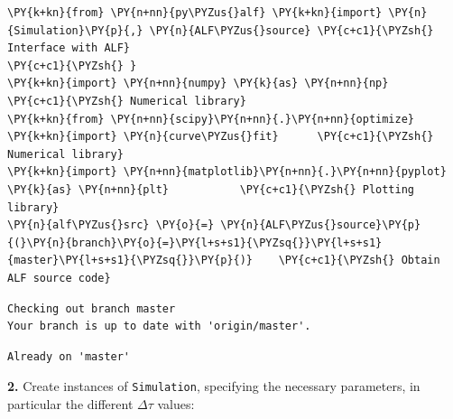     \begin{tcolorbox}[breakable, size=fbox, boxrule=1pt, pad at break*=1mm,colback=cellbackground, colframe=cellborder]
\begin{Verbatim}[commandchars=\\\{\}]
\PY{k+kn}{from} \PY{n+nn}{py\PYZus{}alf} \PY{k+kn}{import} \PY{n}{Simulation}\PY{p}{,} \PY{n}{ALF\PYZus{}source} \PY{c+c1}{\PYZsh{} Interface with ALF}
\PY{c+c1}{\PYZsh{} }
\PY{k+kn}{import} \PY{n+nn}{numpy} \PY{k}{as} \PY{n+nn}{np}                        \PY{c+c1}{\PYZsh{} Numerical library}
\PY{k+kn}{from} \PY{n+nn}{scipy}\PY{n+nn}{.}\PY{n+nn}{optimize} \PY{k+kn}{import} \PY{n}{curve\PYZus{}fit}      \PY{c+c1}{\PYZsh{} Numerical library}
\PY{k+kn}{import} \PY{n+nn}{matplotlib}\PY{n+nn}{.}\PY{n+nn}{pyplot} \PY{k}{as} \PY{n+nn}{plt}           \PY{c+c1}{\PYZsh{} Plotting library}
\PY{n}{alf\PYZus{}src} \PY{o}{=} \PY{n}{ALF\PYZus{}source}\PY{p}{(}\PY{n}{branch}\PY{o}{=}\PY{l+s+s1}{\PYZsq{}}\PY{l+s+s1}{master}\PY{l+s+s1}{\PYZsq{}}\PY{p}{)}    \PY{c+c1}{\PYZsh{} Obtain ALF source code}
\end{Verbatim}
\end{tcolorbox}

    \begin{Verbatim}[commandchars=\\\{\}]
Checking out branch master
Your branch is up to date with 'origin/master'.
    \end{Verbatim}

    \begin{Verbatim}[commandchars=\\\{\}]
Already on 'master'
    \end{Verbatim}

    \textbf{2.} Create instances of \texttt{Simulation}, specifying the
necessary parameters, in particular the different \(\Delta \tau\)
values:

